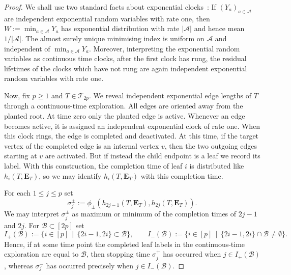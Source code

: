 \documentclass[english,11pt]{smfart}
\newcommand{\cA}{\mathcal{A}}
\newcommand{\cB}{\mathcal{B}}
\newcommand{\cT}{\mathcal{T}}
\numberwithin{equation}{section}
\begin{document}
\begin{proof}
	We shall use two standard facts about exponential clocks~\cite[Thm.~2.3.1, Thm~2.3.3]{zbMATH01013027}:  If $(Y_a)_{a\in\mathcal A}$ are independent exponential random variables with rate one, then
	$
	W := \min_{a \in \cA} Y_a
	$
	has exponential distribution with rate $|\cA|$ and hence mean $1 / |\cA|$. The almost surely unique minimising index is uniform on $\cA$ and independent of $\min_{a \in \cA} Y_a$. Moreover, interpreting the exponential random variables as continuous time clocks, after the first clock has rung, the residual lifetimes of the clocks which have not rung are again independent exponential random variables with rate one.
	
	Now, fix $p \ge 1$ and $T \in \cT_{2p}$. We reveal independent exponential edge lengths of $T$ through a continuous-time exploration. All edges are oriented away from the planted root. At time zero only the planted edge is active. Whenever an edge becomes active, it is assigned an independent exponential clock of rate one. When this clock rings, the edge is completed and deactivated. At this time, if the target vertex of the completed edge is an internal vertex $v$, then the two outgoing edges starting at $v$ are activated. But if instead the child endpoint is a leaf we record its label. With this construction, the completion time of leaf $i$ is distributed like $h_i(T,\bm{E}_T)$, so we may identify $h_i(T,\bm{E}_T)$ with this completion time.
	\smallskip
    
	For each $1 \le j \le p$ set
	\[
		\sigma_j^\pm := \phi_{\pm}\left( h_{2j-1}(T,\bm E_T), h_{2j}(T,\bm E_T) \right).
	\]
	We may interpret $\sigma_j^\pm$ as maximum or minimum of the completion times of $2j-1$ and $2j$. For $\cB \subset [2p]$ set
	\[
		I_+(\cB) := \{i\in[p] \,\mid\, \{2i-1,2i\} \subset \cB\},
		\qquad
		I_-(\cB) := \{i\in[p] \,\mid\, \{2i-1,2i\}\cap \cB \neq \emptyset\}.
	\]
	Hence, if at some time point  the completed leaf labels in the continuous-time exploration are equal to $\cB$, then stopping time $\sigma_j^+$ has occurred when $j\in I_+(\cB)$, whereas $\sigma_j^-$ has occurred precisely when $j\in I_-(\cB)$.
	\smallskip
    

\end{proof}
\end{document}

